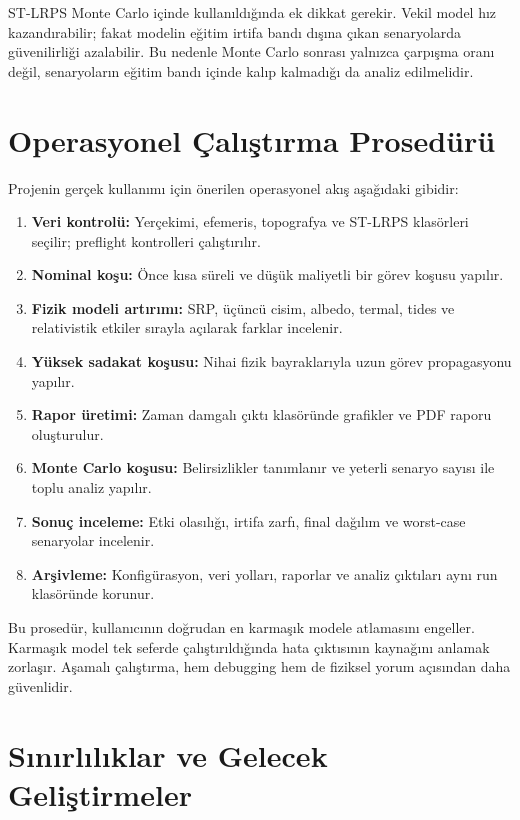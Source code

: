ST-LRPS Monte Carlo içinde kullanıldığında ek dikkat gerekir. Vekil model hız kazandırabilir; fakat modelin eğitim irtifa bandı dışına çıkan senaryolarda güvenilirliği azalabilir. Bu nedenle Monte Carlo sonrası yalnızca çarpışma oranı değil, senaryoların eğitim bandı içinde kalıp kalmadığı da analiz edilmelidir.

\section{Operasyonel Çalıştırma Prosedürü}
\label{sec:operational_workflow}

Projenin gerçek kullanımı için önerilen operasyonel akış aşağıdaki gibidir:

\begin{enumerate}
    \item \textbf{Veri kontrolü:} Yerçekimi, efemeris, topografya ve ST-LRPS klasörleri seçilir; preflight kontrolleri çalıştırılır.
    \item \textbf{Nominal koşu:} Önce kısa süreli ve düşük maliyetli bir görev koşusu yapılır.
    \item \textbf{Fizik modeli artırımı:} SRP, üçüncü cisim, albedo, termal, tides ve relativistik etkiler sırayla açılarak farklar incelenir.
    \item \textbf{Yüksek sadakat koşusu:} Nihai fizik bayraklarıyla uzun görev propagasyonu yapılır.
    \item \textbf{Rapor üretimi:} Zaman damgalı çıktı klasöründe grafikler ve PDF raporu oluşturulur.
    \item \textbf{Monte Carlo koşusu:} Belirsizlikler tanımlanır ve yeterli senaryo sayısı ile toplu analiz yapılır.
    \item \textbf{Sonuç inceleme:} Etki olasılığı, irtifa zarfı, final dağılım ve worst-case senaryolar incelenir.
    \item \textbf{Arşivleme:} Konfigürasyon, veri yolları, raporlar ve analiz çıktıları aynı run klasöründe korunur.
\end{enumerate}

Bu prosedür, kullanıcının doğrudan en karmaşık modele atlamasını engeller. Karmaşık model tek seferde çalıştırıldığında hata çıktısının kaynağını anlamak zorlaşır. Aşamalı çalıştırma, hem debugging hem de fiziksel yorum açısından daha güvenlidir.

\section{Sınırlılıklar ve Gelecek Geliştirmeler}
\label{sec:limitations_future_work}

